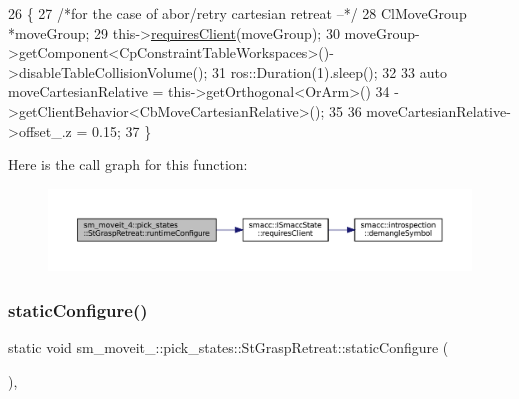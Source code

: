 \begin{DoxyCode}
26     \{
27         \textcolor{comment}{/*for the case of abor/retry cartesian retreat --*/}
28         ClMoveGroup *moveGroup;
29         this->\hyperlink{classsmacc_1_1ISmaccState_a7f95c9f0a6ea2d6f18d1aec0519de4ac}{requiresClient}(moveGroup);
30         moveGroup->getComponent<CpConstraintTableWorkspaces>()->disableTableCollisionVolume();
31         ros::Duration(1).sleep();
32 
33         \textcolor{keyword}{auto} moveCartesianRelative = this->getOrthogonal<OrArm>()
34                                          ->getClientBehavior<CbMoveCartesianRelative>();
35 
36         moveCartesianRelative->offset\_.z = 0.15;
37     \}
\end{DoxyCode}
Here is the call graph for this function\+:
\nopagebreak
\begin{figure}[H]
\begin{center}
\leavevmode
\includegraphics[width=350pt]{structsm__moveit__4_1_1pick__states_1_1StGraspRetreat_a2d386f511e377a4b0eb8193cd24ddb84_cgraph}
\end{center}
\end{figure}
\mbox{\label{structsm__moveit__4_1_1pick__states_1_1StGraspRetreat_a678250d9b3296956f285a2bc27af6641}} 
\subsubsection{\texorpdfstring{static\+Configure()}{staticConfigure()}}
{\footnotesize\ttfamily static void sm\+\_\+moveit\+\_\+::pick\+\_\+states\+::\+St\+Grasp\+Retreat\+::static\+Configure (\begin{DoxyParamCaption}{ }\end{DoxyParamCaption})\hspace{0.3cm}{\ttfamily [inline]}, {\ttfamily [static]}}




